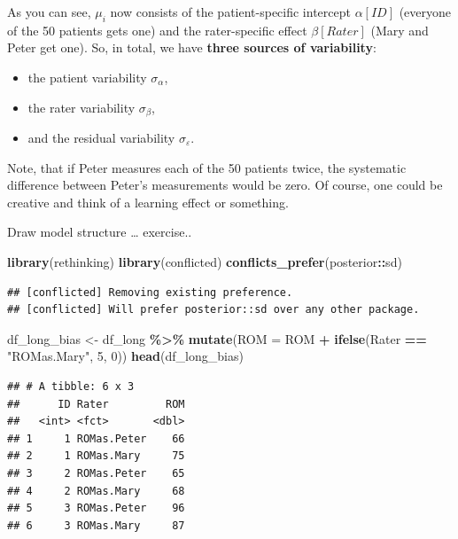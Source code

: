 \documentclass[
]{book}
\newenvironment{Shaded}{\begin{snugshade}}{\end{snugshade}}
\newcommand{\AttributeTok}[1]{\textcolor[rgb]{0.13,0.29,0.53}{#1}}
\newcommand{\DecValTok}[1]{\textcolor[rgb]{0.00,0.00,0.81}{#1}}
\newcommand{\FunctionTok}[1]{\textcolor[rgb]{0.13,0.29,0.53}{\textbf{#1}}}
\newcommand{\NormalTok}[1]{#1}
\newcommand{\OtherTok}[1]{\textcolor[rgb]{0.56,0.35,0.01}{#1}}
\newcommand{\SpecialCharTok}[1]{\textcolor[rgb]{0.81,0.36,0.00}{\textbf{#1}}}
\newcommand{\StringTok}[1]{\textcolor[rgb]{0.31,0.60,0.02}{#1}}
\providecommand{\tightlist}{%
  \setlength{\itemsep}{0pt}\setlength{\parskip}{0pt}}
\begin{document}
As you can see, \(\mu_i\) now consists of the patient-specific intercept \(\alpha[ID]\)
(everyone of the 50 patients gets one)
and the rater-specific effect \(\beta[Rater]\) (Mary and Peter get one).
So, in total, we have \textbf{three sources of variability}:

\begin{itemize}
\tightlist
\item
  the patient variability \(\sigma_{\alpha}\),
\item
  the rater variability \(\sigma_{\beta}\),
\item
  and the residual variability \(\sigma_{\varepsilon}\).
\end{itemize}

Note, that if Peter measures each of the 50 patients twice,
the systematic difference between Peter's measurements would
be zero. Of course, one could be creative and think of
a learning effect or something.

Draw model structure \ldots{} exercise..

\begin{Shaded}
\begin{Highlighting}[]
\FunctionTok{library}\NormalTok{(rethinking)}
\FunctionTok{library}\NormalTok{(conflicted)}
\FunctionTok{conflicts\_prefer}\NormalTok{(posterior}\SpecialCharTok{::}\NormalTok{sd)}
\end{Highlighting}
\end{Shaded}

\begin{verbatim}
## [conflicted] Removing existing preference.
## [conflicted] Will prefer posterior::sd over any other package.
\end{verbatim}

\begin{Shaded}
\begin{Highlighting}[]
\NormalTok{df\_long\_bias }\OtherTok{\textless{}{-}}\NormalTok{ df\_long }\SpecialCharTok{\%\textgreater{}\%}
  \FunctionTok{mutate}\NormalTok{(}\AttributeTok{ROM =}\NormalTok{ ROM }\SpecialCharTok{+} \FunctionTok{ifelse}\NormalTok{(Rater }\SpecialCharTok{==} \StringTok{"ROMas.Mary"}\NormalTok{, }\DecValTok{5}\NormalTok{, }\DecValTok{0}\NormalTok{))}
\FunctionTok{head}\NormalTok{(df\_long\_bias)}
\end{Highlighting}
\end{Shaded}

\begin{verbatim}
## # A tibble: 6 x 3
##      ID Rater         ROM
##   <int> <fct>       <dbl>
## 1     1 ROMas.Peter    66
## 2     1 ROMas.Mary     75
## 3     2 ROMas.Peter    65
## 4     2 ROMas.Mary     68
## 5     3 ROMas.Peter    96
## 6     3 ROMas.Mary     87
\end{verbatim}
\end{document}
